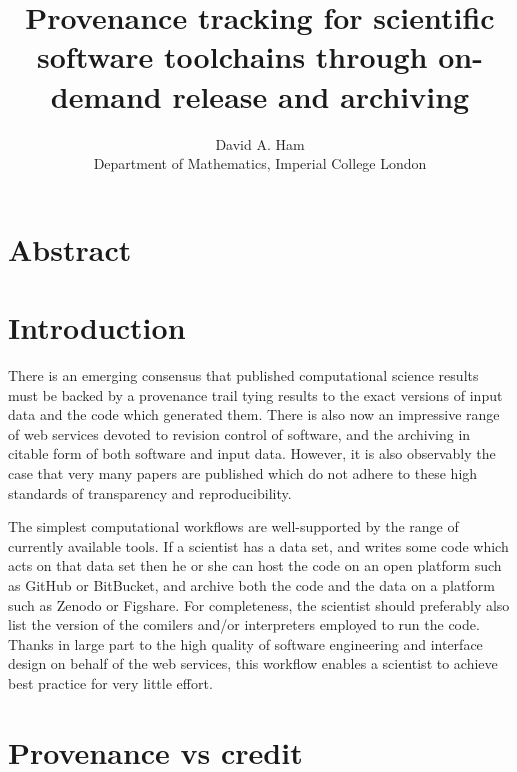 \documentclass[a4paper,11pt]{article}
\begin{document}
\title{Provenance tracking for scientific software toolchains through on-demand release and archiving}

\author{David A. Ham\\Department of Mathematics, Imperial College London}

\maketitle

\section*{Abstract}

\section{Introduction}

There is an emerging consensus that published computational science results
must be backed by a provenance trail tying results to the exact versions of
input data and the code which generated them. There is also now an
impressive range of web services devoted to revision control of software,
and the archiving in citable form of both software and input data. 
However, it is also observably the case that very many papers are published
which do not adhere to these high standards of transparency and
reproducibility. 

The simplest computational workflows are well-supported by the range of
currently available tools. If a scientist has a data set, and writes some
code which acts on that data set then he or she can host the code on an open
platform such as GitHub or BitBucket, and archive both the code and the data
on a platform such as Zenodo or Figshare. For completeness, the scientist
should preferably also list the version of the comilers and/or interpreters
employed to run the code. Thanks in large part to the high quality of
software engineering and interface design on behalf of the web services,
this workflow enables a scientist to achieve best practice for very little
effort. 



\section{Provenance vs credit}
\end{document}
